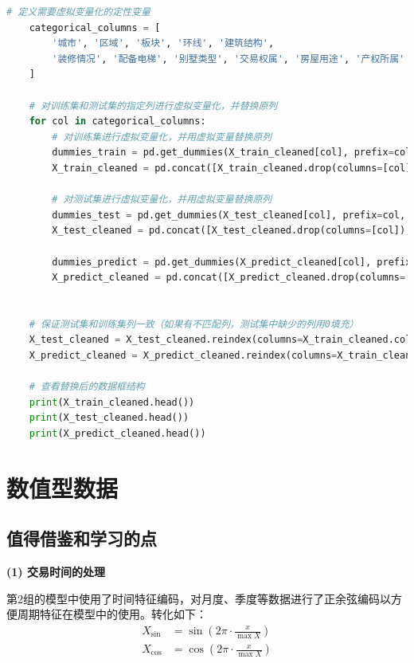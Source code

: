 \documentclass[
    report,     %
    oneside,    %
    UTF8,       %
    zihao=-4    %
]{config} %
\begin{document}
\begin{lstlisting}[label=code:virtual_variable, language=Python, caption=虚拟变量化代码]
    # 定义需要虚拟变量化的定性变量
    categorical_columns = [
        '城市', '区域', '板块', '环线', '建筑结构', 
        '装修情况', '配备电梯', '别墅类型', '交易权属', '房屋用途', '产权所属'
    ]
    
    # 对训练集和测试集的指定列进行虚拟变量化，并替换原列
    for col in categorical_columns:
        # 对训练集进行虚拟变量化，并用虚拟变量替换原列
        dummies_train = pd.get_dummies(X_train_cleaned[col], prefix=col, drop_first=True)
        X_train_cleaned = pd.concat([X_train_cleaned.drop(columns=[col]), dummies_train], axis=1)
        
        # 对测试集进行虚拟变量化，并用虚拟变量替换原列
        dummies_test = pd.get_dummies(X_test_cleaned[col], prefix=col, drop_first=True)
        X_test_cleaned = pd.concat([X_test_cleaned.drop(columns=[col]), dummies_test], axis=1)
    
        dummies_predict = pd.get_dummies(X_predict_cleaned[col], prefix=col, drop_first=True)
        X_predict_cleaned = pd.concat([X_predict_cleaned.drop(columns=[col]), dummies_predict], axis=1)
    
    
    # 保证测试集和训练集列一致（如果有不匹配列，测试集中缺少的列用0填充）
    X_test_cleaned = X_test_cleaned.reindex(columns=X_train_cleaned.columns, fill_value=0)
    X_predict_cleaned = X_predict_cleaned.reindex(columns=X_train_cleaned.columns, fill_value=0)
    
    # 查看替换后的数据框结构
    print(X_train_cleaned.head())
    print(X_test_cleaned.head())
    print(X_predict_cleaned.head())
\end{lstlisting}

\section{数值型数据}

\subsection{值得借鉴和学习的点}

\textbf{(1) 交易时间的处理}

第2组的模型中使用了时间特征编码，对月度、季度等数据进行了正余弦编码以方便周期特征在模型中的使用。转化如下：
\begin{align}
    X_{\sin}&=\sin(2\pi\cdot\frac{x}{\max X}) \\
    X_{\cos}&=\cos(2\pi\cdot\frac{x}{\max X}) 
\end{align}
\end{document}
